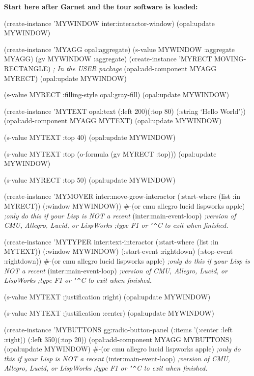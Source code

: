 {\bf Start here after Garnet and the tour software is loaded:}
\begin{programexample}
(create-instance 'MYWINDOW inter:interactor-window)
(opal:update MYWINDOW)

(create-instance 'MYAGG opal:aggregate)
(s-value MYWINDOW :aggregate MYAGG)
(gv MYWINDOW :aggregate)
(create-instance 'MYRECT MOVING-RECTANGLE) {\it ; In the USER package}
(opal:add-component MYAGG MYRECT)
(opal:update MYWINDOW)

(s-value MYRECT :filling-style opal:gray-fill)
(opal:update MYWINDOW)

(create-instance 'MYTEXT opal:text (:left 200)(:top 80)
	(:string `Hello World'))
(opal:add-component MYAGG MYTEXT)
(opal:update MYWINDOW)

(s-value MYTEXT :top 40)
(opal:update MYWINDOW)

(s-value MYTEXT :top (o-formula (gv MYRECT :top)))
(opal:update MYWINDOW)

(s-value MYRECT :top 50)
(opal:update MYWINDOW)

(create-instance 'MYMOVER inter:move-grow-interactor
  (:start-where (list :in MYRECT))
  (:window MYWINDOW))
\#-(or cmu allegro lucid lispworks apple)  {\it ;only do this if your Lisp is NOT a recent}
(inter:main-event-loop)                   {\it ;version of CMU, Allegro, Lucid, or LispWorks}
                                          {\it ;type F1 or {\tt\char`\^}C to exit when finished.}

(create-instance 'MYTYPER inter:text-interactor
  (:start-where (list :in MYTEXT))
  (:window MYWINDOW)
  (:start-event :rightdown)
  (:stop-event :rightdown))
\#-(or cmu allegro lucid lispworks apple)  {\it ;only do this if your Lisp is NOT a recent}
(inter:main-event-loop)                   {\it ;version of CMU, Allegro, Lucid, or LispWorks}
                                          {\it ;type F1 or {\tt\char`\^}C to exit when finished.}

(s-value MYTEXT :justification :right)
(opal:update MYWINDOW)

(s-value MYTEXT :justification :center)
(opal:update MYWINDOW)

(create-instance 'MYBUTTONS gg:radio-button-panel
  (:items '(:center :left :right))
  (:left 350)(:top 20))
(opal:add-component MYAGG MYBUTTONS)
(opal:update MYWINDOW)
\#-(or cmu allegro lucid lispworks apple)  {\it ;only do this if your Lisp is NOT a recent}
(inter:main-event-loop)                   {\it ;version of CMU, Allegro, Lucid, or LispWorks}
                                          {\it ;type F1 or {\tt\char`\^}C to exit when finished.}


\end{programexample}
